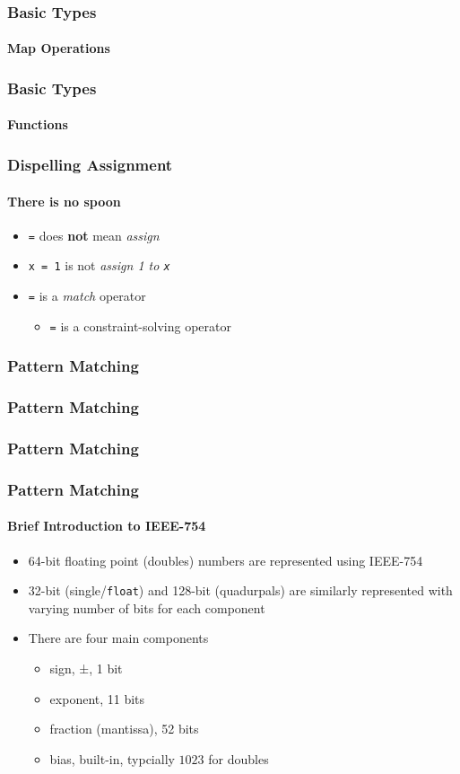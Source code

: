 \documentclass[english]{beamer}
\begin{document}
\begin{frame}[fragile]
\frametitle{Basic Types}
\framesubtitle{Map Operations}

\end{frame}

\begin{frame}[fragile]
\frametitle{Basic Types}
\framesubtitle{Functions}

\end{frame}

\begin{frame}
\frametitle{Dispelling Assignment}
\framesubtitle{There is no spoon}
\begin{itemize}
\item{\texttt{=} does \textbf{not} mean \textit{assign}}
\item{\texttt{x = 1} is not \textit{assign 1 to \texttt{x}}}
\item{\texttt{=} is a \textit{match} operator}
\begin{itemize}
\item{\texttt{=} is a constraint-solving operator}
\end{itemize}
\end{itemize}
\end{frame}

\begin{frame}[fragile]
\frametitle{Pattern Matching}

\end{frame}

\begin{frame}[fragile]
\frametitle{Pattern Matching}

\end{frame}

\begin{frame}[fragile]
\frametitle{Pattern Matching}

\end{frame}

\begin{frame}
\frametitle{Pattern Matching}
\framesubtitle{Brief Introduction to IEEE-754}
\begin{itemize}
\item{64-bit floating point (doubles) numbers are represented using IEEE-754}
\item{32-bit (single/\texttt{float}) and 128-bit (quadurpals) are similarly
represented with varying number of bits for each component}
\item{There are four main components}
\begin{itemize}
\item{sign, ±, 1 bit}
\item{exponent, 11 bits}
\item{fraction (mantissa), 52 bits}
\item{bias, built-in, typcially $1023$ for doubles}
\end{itemize}
\end{itemize}
\end{frame}
\end{document}
